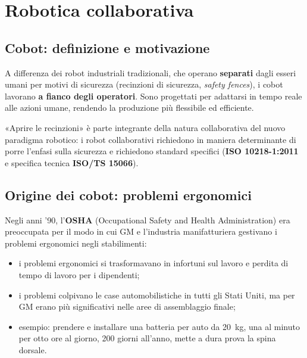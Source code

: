 \chapter{Robotica collaborativa}
\label{cap:cobots}

\section{Cobot: definizione e motivazione}
\begin{defn}
A differenza dei robot industriali tradizionali, che operano \textbf{separati} dagli esseri umani per motivi di sicurezza (recinzioni di sicurezza, \emph{safety fences}), i cobot lavorano \textbf{a fianco degli operatori}. Sono progettati per adattarsi in tempo reale alle azioni umane, rendendo la produzione più flessibile ed efficiente.
\end{defn}

«Aprire le recinzioni» è parte integrante della natura collaborativa del nuovo paradigma robotico: i robot collaborativi richiedono in maniera determinante di porre l'enfasi sulla sicurezza e richiedono standard specifici (\textbf{ISO 10218-1:2011} e specifica tecnica \textbf{ISO/TS 15066}).

\section{Origine dei cobot: problemi ergonomici}
Negli anni '90, l'\textbf{OSHA} (Occupational Safety and Health Administration) era preoccupata per il modo in cui GM e l'industria manifatturiera gestivano i problemi ergonomici negli stabilimenti:
\begin{itemize}
    \item i problemi ergonomici si trasformavano in infortuni sul lavoro e perdita di tempo di lavoro per i dipendenti;
    \item i problemi colpivano le case automobilistiche in tutti gli Stati Uniti, ma per GM erano più significativi nelle aree di assemblaggio finale;
    \item esempio: prendere e installare una batteria per auto da 20~kg, una al minuto per otto ore al giorno, 200 giorni all'anno, mette a dura prova la spina dorsale.
\end{itemize}

